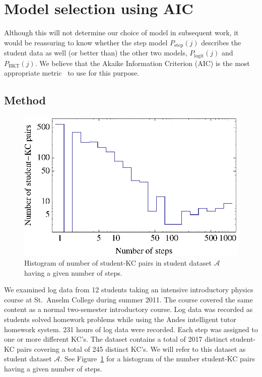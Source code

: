 \documentclass{acmlarge-edm}
\begin{document}
\section{Model selection using AIC}
\label{model-selection}

Although this will not determine our choice of model in subsequent
work, it would be reassuring to know whether the step model 
$P_\mathrm{step}(j)$
describes the student data as well (or better than) the
other two models, $P_\mathrm{logit}(j)$ and $P_\mathrm{BKT}(j)$.  
We believe that the Akaike Information 
Criterion (AIC) is the most appropriate metric~\cite{akaike_new_1974,burnham_model_2002}
to use for this purpose.

\subsection{Method}


\begin{figure}
  \centering \includegraphics{student-kc-length-histogram.eps}
  \caption{Histogram of number of student-KC pairs in student 
    dataset $\mathcal{A}$ having a given number of steps.}
    \label{student-length-histogram}
\end{figure}

We examined log data from 12 students taking an intensive 
introductory physics course at St.\ Anselm College during
summer 2011.  The course
covered the same content as a normal two-semester introductory
course.  Log data was recorded as students solved homework 
problems while using the Andes intelligent tutor homework system.
231 hours of log data were recorded.
Each step was assigned to one or more different KC's.  
The dataset contains a total of 2017 distinct
student-KC pairs covering a total of 245 distinct KC's.
We will refer to this dataset as student dataset $\mathcal{A}$.
See Figure~\ref{student-length-histogram} for a histogram
of the number student-KC pairs having a given number of steps.
\end{document}
